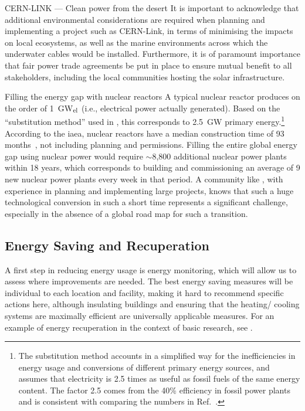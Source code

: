 \documentclass[../SustainableHEP.tex]{subfiles}
\begin{document}
\begin{casestudy}{CERN-LINK --- Clean power from the desert}
It is important to acknowledge that additional environmental considerations are required when planning and implementing a project such as CERN-Link, in terms of minimising the impacts on local ecosystems, as well as the marine environments across which the underwater cables would be installed.  Furthermore, it is of paramount importance that fair power trade agreements be put in place to ensure mutual benefit to all stakeholders, including the local communities hosting the solar infrastructure.

\end{casestudy}



\begin{casestudy}{Filling the energy gap with nuclear reactors\label{case:nuclear}}%
    A typical nuclear reactor produces on the order of 1~GW$_{\rm el}$ (i.e., electrical power actually generated).
    Based on the ``substitution method'' used in , this corresponds to 2.5~GW primary energy.\footnote{The substitution method accounts in a simplified way for the inefficiencies in energy usage and conversions of different primary energy sources, and assumes that electricity is 2.5 times as useful as fossil fuels of the same energy content.  The factor 2.5 comes from the 40\% efficiency in fossil power plants~\cite{BP} and is consistent with comparing the numbers in Ref.~\cite{OWDprod}.} 
    According to the \acrshort{iaea}, nuclear reactors have a median construction time of 93 months~\cite{IAEANuclear}, not including planning and permissions. 
    Filling the entire global energy gap using nuclear power would require $\sim$8,800 additional nuclear power plants within 18 years, which corresponds to building and commissioning an average of 9 new nuclear power plants every week in that period. 
    A community like \ACR, with experience in planning and implementing large projects, knows that such a huge technological conversion in such a short time represents a significant challenge, especially in the absence of a global road map for such a transition.
\end{casestudy}



\subsection{Energy Saving and Recuperation}
\label{sec:Ene-Saving}
A first step in reducing energy usage is energy monitoring, which will allow us to assess where improvements are needed. The best energy saving measures will be individual to each location and facility, making it hard to recommend specific actions here, although insulating buildings and ensuring that the heating/ cooling systems are maximally efficient are universally applicable measures. For an example of energy recuperation in the context of basic research, see .
\end{document}
